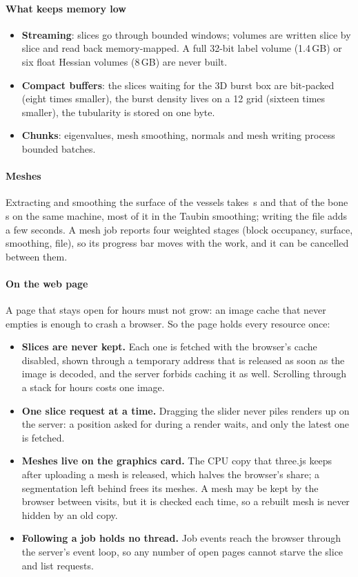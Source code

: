 \paragraph{What keeps memory low}
\begin{itemize}
  \item \textbf{Streaming}: slices go through bounded windows; volumes are written slice by slice and
        read back memory-mapped. A full 32-bit label volume (1.4\,GB) or six float Hessian volumes
        (8\,GB) are never built.
  \item \textbf{Compact buffers}: the slices waiting for the 3D burst box are bit-packed (eight times
        smaller), the burst density lives on a 12\um{} grid (sixteen times smaller), the tubularity is
        stored on one byte.
  \item \textbf{Chunks}: eigenvalues, mesh smoothing, normals and mesh writing process bounded
        batches.
\end{itemize}

\paragraph{Meshes} Extracting and smoothing the surface of the vessels takes
\pbValueMeshVesselSeconds\,s and that of the bone \pbValueMeshBoneSeconds\,s on the same machine, most
of it in the Taubin smoothing; writing the file adds a few seconds. A mesh job reports
four weighted stages (block occupancy, surface, smoothing, file), so its progress bar moves with the
work, and it can be cancelled between them.

\paragraph{On the web page} A page that stays open for hours must not grow: an image cache that never
empties is enough to crash a browser. So the page holds every resource once:
\begin{itemize}
  \item \textbf{Slices are never kept.} Each one is fetched with the browser's cache disabled, shown
        through a temporary  address that is released as soon as the image is decoded, and
        the server forbids caching it as well. Scrolling through a stack for hours costs one image.
  \item \textbf{One slice request at a time.} Dragging the slider never piles renders up on the
        server: a position asked for during a render waits, and only the latest one is fetched.
  \item \textbf{Meshes live on the graphics card.} The CPU copy that three.js keeps after uploading a
        mesh is released, which halves the browser's share; a segmentation left behind frees its
        meshes. A mesh may be kept by the browser between visits, but it is checked each time, so a
        rebuilt mesh is never hidden by an old copy.
  \item \textbf{Following a job holds no thread.} Job events reach the browser through the server's
        event loop, so any number of open pages cannot starve the slice and list requests.
\end{itemize}

